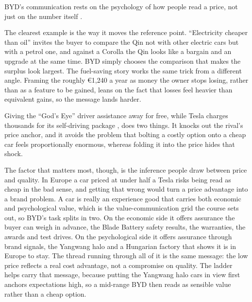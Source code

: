 
BYD's communication rests on the psychology of how people read a price, not just on the number itself \cite{nagle2018}.

The clearest example is the way it moves the reference point. ``Electricity cheaper than oil'' invites the buyer to compare the Qin not with other electric cars but with a petrol one, and against a Corolla the Qin looks like a bargain and an upgrade at the same time. BYD simply chooses the comparison that makes the surplus look largest. The fuel-saving story works the same trick from a different angle. Framing the roughly \euro1{,}240 a year as money the owner stops losing, rather than as a feature to be gained, leans on the fact that losses feel heavier than equivalent gains, so the message lands harder.

Giving the ``God's Eye'' driver assistance away for free, while Tesla charges thousands for its self-driving package \cite{insidechinaADAS}, does two things. It knocks out the rival's price anchor, and it avoids the problem that bolting a costly option onto a cheap car feels proportionally enormous, whereas folding it into the price hides that shock.

The factor that matters most, though, is the inference people draw between price and quality. In Europe a car priced at under half a Tesla risks being read as cheap in the bad sense, and getting that wrong would turn a price advantage into a brand problem. A car is really an experience good that carries both economic and psychological value, which is the value-communication grid the course sets out, so BYD's task splits in two. On the economic side it offers assurance the buyer can weigh in advance, the Blade Battery safety results, the warranties, the awards and test drives. On the psychological side it offers assurance through brand signals, the Yangwang halo and a Hungarian factory that shows it is in Europe to stay. The thread running through all of it is the same message: the low price reflects a real cost advantage, not a compromise on quality. The ladder helps carry that message, because putting the Yangwang halo cars in view first anchors expectations high, so a mid-range BYD then reads as sensible value rather than a cheap option.
